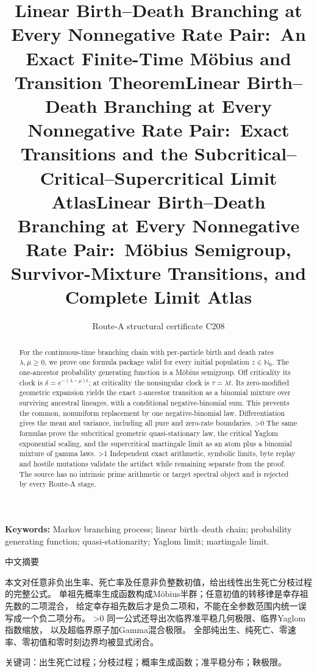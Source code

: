 \documentclass[9pt]{extarticle}
\title{Linear Birth--Death Branching at Every Nonnegative Rate Pair:\
An Exact Finite-Time M\"obius and Transition Theorem}
\title{Linear Birth--Death Branching at Every Nonnegative Rate Pair:\
Exact Transitions and the Subcritical--Critical--Supercritical Limit Atlas}
\title{Linear Birth--Death Branching at Every Nonnegative Rate Pair:\
M\"obius Semigroup, Survivor-Mixture Transitions, and Complete Limit Atlas}
\author{Route-A structural certificate C208}
\date{}
\newcommand{\Nzero}{\mathbb N_0}
\begin{document}
\maketitle
\begin{abstract}
For the continuous-time branching chain with per-particle birth and death
rates $\lambda,\mu\geq0$, we prove one formula package valid for every initial
population $z\in\Nzero$.  The one-ancestor probability generating function
is a M\"obius semigroup.  Off criticality its clock is
$\delta=e^{-(\lambda-\mu)t}$; at criticality the nonsingular clock is
$\tau=\lambda t$.  Its zero-modified geometric expansion yields the exact
$z$-ancestor transition as a binomial mixture over surviving ancestral
lineages, with a conditional negative-binomial sum.  This prevents the
common, nonuniform replacement by one negative-binomial law.  Differentiation
gives the mean and variance, including all pure and zero-rate boundaries.
\ifnum\CRevisionRound>0
The same formulas prove the subcritical geometric quasi-stationary law, the
critical Yaglom exponential scaling, and the supercritical martingale limit
as an atom plus a binomial mixture of gamma laws.
\fi
\ifnum\CRevisionRound>1
Independent exact arithmetic, symbolic limits, byte replay and hostile
mutations validate the artifact while remaining separate from the proof.
The source has no intrinsic prime arithmetic or target spectral object and
is rejected by every Route-A stage.
\fi
\end{abstract}
\noindent\textbf{Keywords:} Markov branching process; linear birth--death
chain; probability generating function; quasi-stationarity; Yaglom limit;
martingale limit.

\begin{otherlanguage}{chinese-simplified}
\begin{center}{\large 中文摘要}\end{center}
本文对任意非负出生率、死亡率及任意非负整数初值，给出线性出生死亡分枝过程的完整公式。
单祖先概率生成函数构成\foreignlanguage{english}{M\"obius}半群；任意初值的转移律是幸存祖先数的二项混合，
给定幸存祖先数后才是负二项和，不能在全参数范围内统一误写成一个负二项分布。
\ifnum\CRevisionRound>0
同一公式还导出次临界准平稳几何极限、临界\foreignlanguage{english}{Yaglom}指数缩放，
以及超临界原子加\foreignlanguage{english}{Gamma}混合极限。
\fi
全部纯出生、纯死亡、零速率、零初值和零时刻边界均被显式闭合。

\noindent 关键词：出生死亡过程；分枝过程；概率生成函数；准平稳分布；鞅极限。
\end{otherlanguage}
\end{document}
